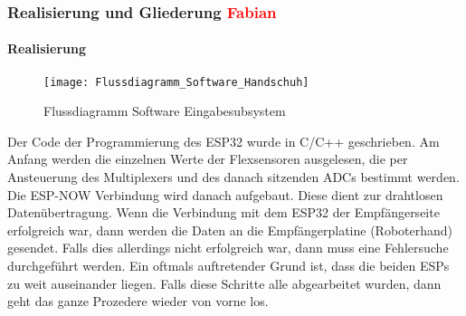 \documentclass[titlepage,12pt,twoside]{article}
\begin{document}
\subsubsection{Realisierung und Gliederung \textcolor{red}{Fabian}}
\paragraph{Realisierung}
\hfill \break
\hfill \break
\begin{figure}[H]
	\begin{center}
		\scalebox{0.5}
		{\texttt{[image: Flussdiagramm\_Software\_Handschuh]}}
		\caption{Flussdiagramm Software Eingabesubsystem}
		\label{fig:Flussdiagramm_Software_Handschuh}			
	\end{center}
\end{figure}
\hfill \break
Der Code der Programmierung des ESP32 wurde in C/C++ geschrieben. Am Anfang werden die einzelnen Werte der Flexsensoren 
ausgelesen, die per Ansteuerung des Multiplexers und des danach sitzenden ADCs bestimmt werden. Die ESP-NOW Verbindung wird 
danach aufgebaut. Diese dient zur drahtlosen Datenübertragung. Wenn die Verbindung mit dem ESP32 der Empfängerseite erfolgreich 
war, dann werden die Daten an die Empfängerplatine (Roboterhand) gesendet. Falls dies allerdings nicht erfolgreich war, dann 
muss eine Fehlersuche durchgeführt werden. Ein oftmals auftretender Grund ist, dass die beiden ESPs zu weit auseinander liegen. 
Falls diese Schritte alle abgearbeitet wurden, dann geht das ganze Prozedere wieder von vorne los. \\
\\
\end{document}
